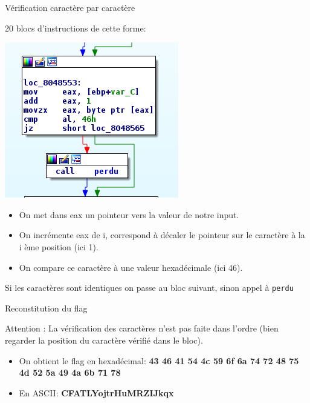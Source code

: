 \documentclass[10pt,sans,usenames,dvipsnames,french,compress]{beamer}
\begin{document}
\begin{frame}[fragile]{Vérification caractère par caractère}
	\begin{block}{}
		20 blocs d'instructions de cette forme:

 		\begin{center}
			\includegraphics[height=0.2\linewidth]{114/cmpcara.png}
		\end{center}
	\end{block}

	\begin{block}{}
		\begin{itemize}
			\item On met dans eax un pointeur vers la valeur de notre input.
			\item On incrémente eax de i, correspond à décaler le pointeur sur le caractère à la i ème position (ici 1).
			\item On compare ce caractère à une valeur hexadécimale (ici 46).
		\end{itemize}
	\end{block}

	\begin{block}{}
		Si les caractères sont identiques on passe au bloc suivant, sinon appel à \texttt{perdu}
	\end{block}
\end{frame}

\begin{frame}[fragile]{Reconstitution du flag}
	\begin{block}{Attention :}
		La vérification des caractères n'est pas faite dans l'ordre (bien regarder la position du caractère vérifié dans le bloc).
	\end{block}

	\begin{exampleblock}{}
		\begin{itemize}
			\item On obtient le flag en hexadécimal: \textbf{43 46 41 54 4c 59 6f 6a 74 72 48 75 4d 52 5a 49 4a 6b 71 78}
			\item En ASCII: \textbf{CFATLYojtrHuMRZIJkqx}
		\end{itemize}
	\end{exampleblock}
\end{frame}
\end{document}
